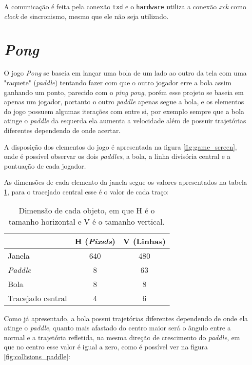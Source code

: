 \documentclass[twocolumn]{article}
\begin{document}
        A comunicação é feita pela conexão \verb|txd| e o \verb|hardware| utiliza a conexão \textsl{xck} como \textsl{clock} de sincronismo, mesmo que ele não seja utilizado.
        
\section{\textsl{Pong}}

    O jogo \textsl{Pong} se baseia em lançar uma bola de um lado ao outro da tela com uma "raquete" (\textsl{paddle}) tentando fazer com que o outro jogador erre a bola assim ganhando um ponto, parecido com o \textsl{ping pong}, porém esse projeto se baseia em apenas um jogador, portanto o outro \textsl{paddle} apenas segue a bola, e os elementos do jogo possuem algumas iterações com entre si, por exemplo sempre que a bola atinge o \textsl{paddle} da esquerda ela aumenta a velocidade além de possuir trajetórias diferentes dependendo de onde acertar.

    A disposição dos elementos do jogo é apresentada na figura \ref{fig:game_screen}, onde é possível observar os dois \textsl{paddles}, a bola, a linha divisória central e a pontuação de cada jogador.
    
    

    As dimensões de cada elemento da janela segue os valores apresentados na tabela \ref{tab:dimension_screen_game}, para o tracejado central esse é o valor de cada traço:
    
    \begin{table}[H]
        \centering
        \begin{tabular}{l c c}                                   \\ \cline{2-3}
                              & H (\textsl{Pixels}) & V (Linhas) \\ \hline
            Janela            & 640                 & 480        \\ 
            \textsl{Paddle}   & 8                   & 63         \\ 
            Bola              & 8                   & 8          \\
            Tracejado central & 4                   & 6          \\ \hline
        \end{tabular}
        \caption{Dimensão de cada objeto, em que H é o tamanho horizontal e V é o tamanho vertical.}
        \label{tab:dimension_screen_game}
    \end{table}

    Como já apresentado, a bola possui trajetórias diferentes dependendo de onde ela atinge o \textsl{paddle}, quanto mais afastado do centro maior será o ângulo entre a normal e a trajetória refletida, na mesma direção de crescimento do \textsl{paddle}, em que no centro esse valor é igual a zero, como é possível ver na figura \ref{fig:collisions_paddle}:
    
    

    
    
\end{document}
